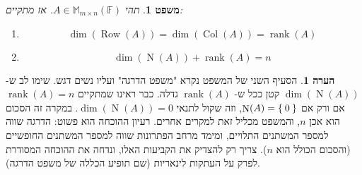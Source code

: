 \documentclass[12pt]{report}
\theoremstyle{plain}
\newtheorem{theorem}{משפט}[chapter]
\theoremstyle{definition}
\newtheorem{remark}{הערה}[chapter]
\newcommand{\F}{\mathbb{F}}
\DeclareMathOperator{\rank}{rank}
\newcommand{\M}{\mathbb{M}}
\newcommand{\0}{\mathbf{0}}
\DeclareMathOperator{\Row}{Row}
\DeclareMathOperator{\Col}{Col}
\DeclareMathOperator{\Null}{N}
\begin{document}
\begin{theorem}\label{thm:rank-nullity}
תהי
$A\in\M_{m\times n}(\F)$. 
אז מתקיים:
\begin{enumerate}[label=\alph*.]
\item
$$
\dim(\Row(A))=\dim(\Col(A))=\rank(A)
$$


\item
$$
\dim(\Null(A))+\rank(A)=n
$$
\end{enumerate}
\end{theorem}

\begin{remark}
הסעיף השני של המשפט נקרא "משפט הדרגה" ועליו נשים דגש. שימו לב ש-
$\dim(\Null(A))$
קטן ככל ש-
$\rank(A)$
גדלה. כבר ראינו שמתקיים
$\rank(A)=n$
אם ורק אם
$\Null(A)=\Set{0}$,
וזה שקול לתנאי
$\dim(\Null(A))=0$.
במקרה זה הסכום הוא אכן
$n$,
והמשפט מכליל זאת למקרים אחרים. רעיון ההוכחה הוא פשוט: הדרגה שווה למספר המשתנים התלויים, ומימד מרחב הפתרונות שווה למספר המשתנים החופשיים (והסכום הכולל הוא 
$n$).
צריך רק להצדיק את הקביעות האלו, ונדחה את ההוכחה המסודרת לפרק על העתקות לינאריות (שם תופיע הכללה של משפט הדרגה).
\end{remark}

\end{document}
